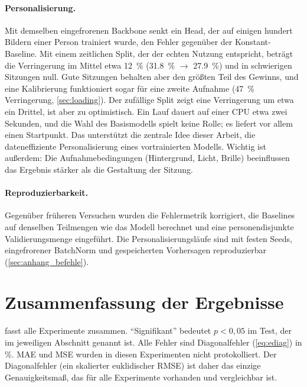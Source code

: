 \paragraph{Personalisierung.}
Mit demselben eingefrorenen Backbone senkt ein Head, der auf einigen hundert
Bildern einer Person trainiert wurde, den Fehler gegenüber der
Konstant-Baseline. Mit einem zeitlichen Split, der der echten Nutzung
entspricht, beträgt die Verringerung im Mittel etwa \SI{12}{\percent}
(\SI{31,8}{\percent} $\rightarrow$ \SI{27,9}{\percent}) und in schwierigen
Sitzungen null. Gute Sitzungen behalten aber den größten Teil des Gewinns, und
eine Kalibrierung funktioniert sogar für eine zweite Aufnahme
(\SI{47}{\percent} Verringerung, \cref{sec:loading}). Der zufällige Split
zeigt eine Verringerung um etwa ein Drittel, ist aber zu optimistisch. Ein Lauf
dauert auf einer CPU etwa zwei Sekunden, und die Wahl des Basismodells spielt
keine Rolle; es liefert vor allem einen Startpunkt. Das unterstützt die zentrale
Idee dieser Arbeit, die dateneffiziente Personalisierung eines vortrainierten
Modells. Wichtig ist außerdem: Die Aufnahmebedingungen (Hintergrund, Licht,
Brille) beeinflussen das Ergebnis stärker als die Gestaltung der Sitzung.

\paragraph{Reproduzierbarkeit.} Gegenüber früheren Versuchen wurden die
Fehlermetrik korrigiert, die Baselines auf denselben Teilmengen wie das Modell
berechnet und eine personendisjunkte Validierungsmenge eingeführt. Die
Personalisierungsläufe sind mit festen Seeds, eingefrorener BatchNorm und
gespeicherten Vorhersagen reproduzierbar (\cref{sec:anhang_befehle}).

\section{Zusammenfassung der Ergebnisse}
\label{sec:summary}

 fasst alle Experimente zusammen. \enquote{Signifikant}
bedeutet $p<0,05$ im Test, der im jeweiligen Abschnitt genannt ist. Alle
Fehler sind Diagonalfehler (\cref{eq:ediag}) in \si{\percent}. MAE und MSE
wurden in diesen Experimenten nicht protokolliert. Der Diagonalfehler (ein
skalierter euklidischer RMSE) ist daher das einzige Genauigkeitsmaß, das für
alle Experimente vorhanden und vergleichbar ist.

